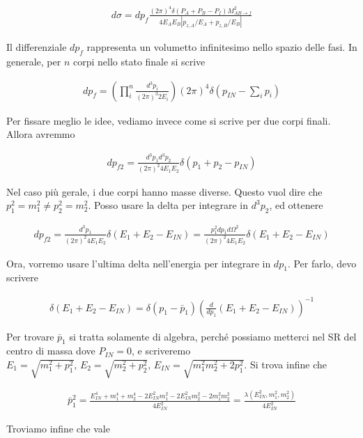 \documentclass[11pt]{report}
\begin{document}
\begin{align}
    d\sigma = dp_f \frac{(2\pi)^4 \delta(P_A + P_B - P_f)M^2_{AB \rightarrow f}}{4E_AE_B |p_{z,A}/E_A + p_{z,B}/E_B|}
\end{align}

Il differenziale \(dp_f\) rappresenta un volumetto infinitesimo nello spazio delle fasi. In generale, per \(n\) corpi nello stato finale si scrive 

\begin{align}
    dp_f = \left(\prod_i^n \frac{d^3p_i}{(2\pi)^3 2E_i} \right)(2\pi)^4 \delta(p_{IN} - \sum_i p_i)
\end{align}

Per fissare meglio le idee, vediamo invece come si scrive per due corpi finali. Allora avremmo 

\begin{align}
    dp_{f2} = \frac{d^3p_1 d^3p_2}{(2\pi)^2 4E_1E_2}\delta(p_1 + p_2 -p_{IN})
\end{align}

Nel caso più gerale, i due corpi hanno masse diverse. Questo vuol dire che \(p_1^2 = m_1^2 \neq p_2^2 = m_2^2\). Posso usare la delta per integrare in \(d^3p_2\), ed ottenere 

\begin{align}
    dp_{f2} = \frac{d^3p_1}{(2\pi)^2 4E_1E_2}\delta(E_1 +E_2 - E_{IN}) = \frac{p_1^2 dp_1 d\Omega^2}{(2\pi)^2 4E_1E_2}\delta(E_1 +E_2 - E_{IN})
\end{align}

Ora, vorremo usare l'ultima delta nell'energia per integrare in \(dp_1\). Per farlo, devo scrivere 

\begin{align}
    \delta(E_1+E_2-E_{IN}) = \delta(p_1 - \bar{p}_1)\left(\frac{d}{dp_1}(E_1 + E_2 -E_{IN}) \right)^{-1}
\end{align}

Per trovare \(\bar{p}_1\) si tratta solamente di algebra, perché possiamo metterci nel SR del centro di massa dove \(P_{IN} = 0\), e scriveremo \(E_{1} = \sqrt{m_1^2 + p_1^2}, \, E_{2} = \sqrt{m_2^2 + p_2^2}, \, E_{IN} = \sqrt{m_1^2 m_2^2 + 2p_1^2}\). Si trova infine che 

\begin{align}
    \bar{p}^2_1 = \frac{E^4_{IN} + m_1^4 + m_2^4 -2E_{IN}^2 m_1^2 -2E^2_{IN}m_2^2 - 2m_1^2m_2^2}{4E^2_{IN}} = \frac{\lambda(E^2_{IN}, m_1^2, m_2^2)}{4E^2_{IN}}
\end{align}

Troviamo infine che vale 
\end{document}
